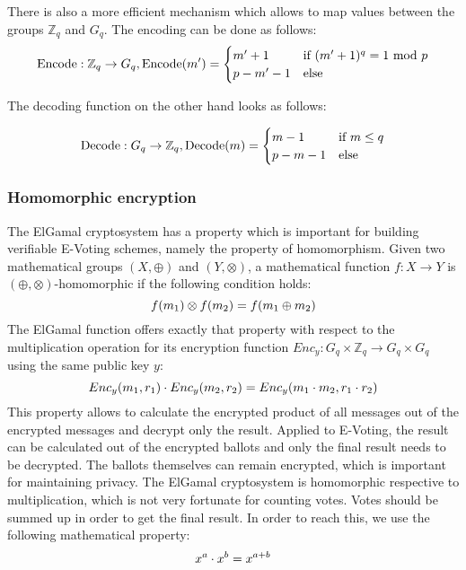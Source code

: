 \documentclass[numbers=noenddot, abstract=on, a4paper, headsepline,
footsepline, oneside, draft=off]{scrreprt}
\begin{document}
There is also a more efficient mechanism which allows to
map values between the groups $\mathbb{Z}_q$ and $G_q$. The encoding can be done
as follows:
\begin{equation}
\text{Encode} : \mathbb{Z}_q \rightarrow G_q, \text{Encode}(m') = 
	\begin{cases}
	m'+1 & \text{if } (m'+1)^q = 1 \text{ mod } p \\
	p-m'-1 & \text{else}
	\end{cases} \notag
\end{equation}

The decoding function on the other hand looks as follows:

\begin{equation}
\text{Decode} : G_q \rightarrow \mathbb{Z}_q, \text{Decode}(m) = 
	\begin{cases}
	m-1 & \text{if } m \leq q \\
	p-m-1 & \text{else}
	\end{cases} \notag
\end{equation}

\subsubsection{Homomorphic encryption}
\label{sec:homenc}
The ElGamal cryptosystem has a property
which is important for building verifiable E-Voting schemes, namely the property
of homomorphism. Given two mathematical groups $(X,\oplus)$ and $(Y,\otimes)$, a
mathematical function $f:X \rightarrow Y$ is $(\oplus, \otimes)$-homomorphic if
the following condition holds:
\begin{equation}
f(m_1) \otimes f(m_2) = f(m_1 \oplus m_2) \notag
\end{equation}
The ElGamal function offers exactly that property with respect to the
multiplication operation for its encryption function $Enc_y:G_q \times
\mathbb{Z}_q \rightarrow G_q \times G_q$ using the same public key $y$:
\begin{equation}
Enc_y(m_1, r_1) \cdot Enc_y(m_2, r_2) = Enc_y(m_1 \cdot m_2, r_1 \cdot r_2)
\notag
\end{equation}
This property allows to calculate the encrypted product of all messages out of
the encrypted messages and decrypt only the result. Applied to E-Voting, the
result can be calculated out of the encrypted ballots and only the final result
needs to be decrypted. The ballots themselves can remain encrypted, which is
important for maintaining privacy. The ElGamal cryptosystem is homomorphic
respective to multiplication, which is not very fortunate for counting votes.
Votes should be summed up in order to get the final result. In order to reach
this, we use the following mathematical property:
\begin{equation}
x^a \cdot x^b = x^{a+b} \notag
\end{equation}
\end{document}
